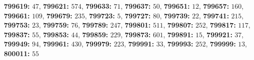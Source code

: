 \textsf{\bfseries 799619:} $47$, \textsf{\bfseries 799621:} $574$, \textsf{\bfseries 799633:} $71$, \textsf{\bfseries 799637:} $50$, \textsf{\bfseries 799651:} $12$, \textsf{\bfseries 799657:} $160$, \textsf{\bfseries 799661:} $109$, \textsf{\bfseries 799679:} $235$, \textsf{\bfseries 799723:} $5$, \textsf{\bfseries 799727:} $80$, \textsf{\bfseries 799739:} $22$, \textsf{\bfseries 799741:} $215$, \textsf{\bfseries 799753:} $23$, \textsf{\bfseries 799759:} $76$, \textsf{\bfseries 799789:} $247$, \textsf{\bfseries 799801:} $511$, \textsf{\bfseries 799807:} $252$, \textsf{\bfseries 799817:} $117$, \textsf{\bfseries 799837:} $55$, \textsf{\bfseries 799853:} $44$, \textsf{\bfseries 799859:} $229$, \textsf{\bfseries 799873:} $601$, \textsf{\bfseries 799891:} $15$, \textsf{\bfseries 799921:} $37$, \textsf{\bfseries 799949:} $94$, \textsf{\bfseries 799961:} $430$, \textsf{\bfseries 799979:} $223$, \textsf{\bfseries 799991:} $33$, \textsf{\bfseries 799993:} $252$, \textsf{\bfseries 799999:} $13$, \textsf{\bfseries 800011:} $55$